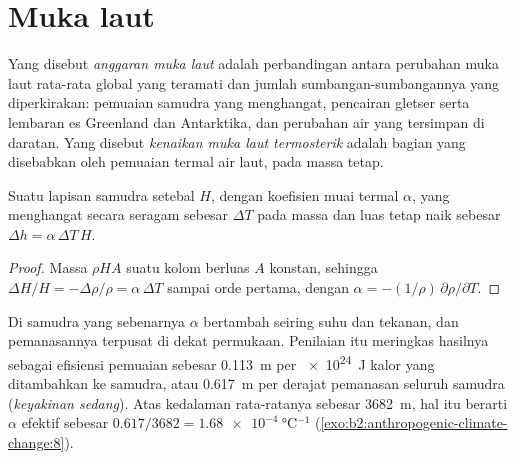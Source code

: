 \section{Muka laut}\label{sec:b2:anthropogenic-climate-change:sea-level}

\begin{definition}\label{def:b2:anthropogenic-climate-change:sea-level}
Yang disebut \emph{anggaran muka laut} adalah perbandingan antara perubahan muka laut rata-rata
global yang teramati dan jumlah sumbangan-sumbangannya yang diperkirakan: pemuaian samudra yang
menghangat, pencairan gletser serta lembaran es Greenland dan Antarktika, dan perubahan
air yang tersimpan di daratan. Yang disebut \emph{kenaikan muka laut termosterik} adalah
bagian yang disebabkan oleh pemuaian termal air laut, pada massa tetap.
\end{definition}

\begin{proposition}\label{prop:b2:anthropogenic-climate-change:thermosteric}
Suatu lapisan samudra setebal $H$, dengan koefisien muai termal $\alpha$, yang menghangat secara seragam
sebesar $\Delta T$ pada massa dan luas tetap naik sebesar $\Delta h = \alpha\,\Delta T\,H$.
\end{proposition}
\begin{proof}
Massa $\rho H A$ suatu kolom berluas $A$ konstan, sehingga $\Delta H/H = -\Delta\rho/\rho =
\alpha\,\Delta T$ sampai orde pertama, dengan $\alpha = -(1/\rho)\,\partial\rho/\partial T$.
\end{proof}

Di samudra yang sebenarnya $\alpha$ bertambah seiring suhu dan tekanan, dan pemanasannya terpusat di dekat
permukaan. Penilaian itu meringkas hasilnya sebagai efisiensi pemuaian sebesar \qty{0.113}{m} per
\qty{e24}{J} kalor yang ditambahkan ke samudra, atau \qty{0.617}{m} per derajat pemanasan seluruh samudra
(\emph{keyakinan sedang}). Atas kedalaman rata-ratanya sebesar \qty{3682}{m}, hal itu berarti $\alpha$ efektif sebesar
$0.617/3682 = \qty{1.68e-4}{\celsius^{-1}}$ (\cref{exo:b2:anthropogenic-climate-change:8}).

